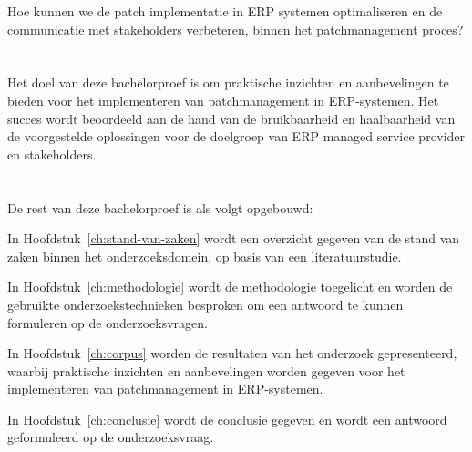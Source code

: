 Hoe kunnen we de patch implementatie in ERP systemen optimaliseren en de communicatie met stakeholders verbeteren, binnen het patchmanagement proces?

\section{}%
\label{sec:onderzoeksdoelstelling}

Het doel van deze bachelorproef is om praktische inzichten en aanbevelingen te bieden voor het implementeren van patchmanagement in ERP-systemen. Het succes wordt beoordeeld aan de hand van de bruikbaarheid en haalbaarheid van de voorgestelde oplossingen voor de doelgroep van ERP managed service provider en stakeholders.

\section{}%
\label{sec:opzet-bachelorproef}

De rest van deze bachelorproef is als volgt opgebouwd:


In Hoofdstuk~\ref{ch:stand-van-zaken} wordt een overzicht gegeven van de stand van zaken binnen het onderzoeksdomein, op basis van een literatuurstudie.

In Hoofdstuk~\ref{ch:methodologie} wordt de methodologie toegelicht en worden de gebruikte onderzoekstechnieken besproken om een antwoord te kunnen formuleren op de onderzoeksvragen.

In Hoofdstuk~\ref{ch:corpus} worden de resultaten van het onderzoek gepresenteerd, waarbij praktische inzichten en aanbevelingen worden gegeven voor het implementeren van patchmanagement in ERP-systemen.

In Hoofdstuk~\ref{ch:conclusie} wordt de conclusie gegeven en wordt een antwoord geformuleerd op de onderzoeksvraag. 

